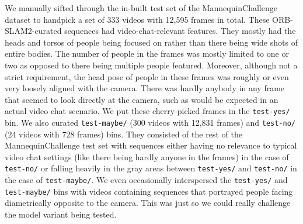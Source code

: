 We manually sifted through the in-built test set of the MannequinChallenge dataset to handpick a set of 333 videos with 12,595 frames in total. These ORB-SLAM2-curated sequences had video-chat-relevant features. They mostly had the heads and torsos of people being focused on rather than there being wide shots of entire bodies. The number of people in the frames was mostly limited to one or two as opposed to there being multiple people featured. Moreover, although not a strict requirement, the head pose of people in these frames was roughly or even very loosely aligned with the camera. There was hardly anybody in any frame that seemed to look directly at the camera, such as would be expected in an actual video chat scenario. We put these cherry-picked frames in the \texttt{test-yes/} bin. We also curated \texttt{test-maybe/} (300 videos with 12,831 frames) and \texttt{test-no/} (24 videos with 728 frames) bins. They consisted of the rest of the MannequinChallenge test set with sequences either having no relevance to typical video chat settings (like there being hardly anyone in the frames) in the case of \texttt{test-no/} or falling heavily in the gray areas between \texttt{test-yes/} and \texttt{test-no/} in the case of \texttt{test-maybe/}. We even occasionally interspersed the \texttt{test-yes/} and \texttt{test-maybe/} bins with videos containing sequences that portrayed people facing diametrically opposite to the camera. This was just so we could really challenge the model variant being tested.

